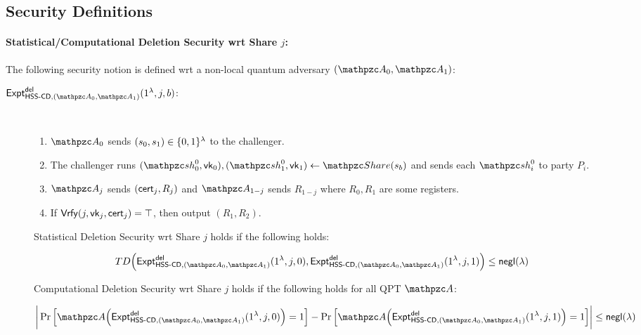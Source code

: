 \begin{description}
\begin{comment}
\item [Deletion Correctness (Optional):] The following condition
holds for all $i \in \bit$ and $q = \poly(\secp)$:
\begin{align}
\Pr\left[
\Vrfy(i, \vk_i, \cert_i) \rightarrow \top
\ :
\begin{array}{ll}
(\qsh_0^0, \vk_0), (\qsh_1^0, \vk_1) \gets \Sh(s)\\
\forall j \in [q]: (\sh_i^j, \qsh_i^j) \leftarrow \Ev(C_j, i,
(\sh_i^{j-1}, \qsh_i^{j-1}))\\
\cert_i \leftarrow \Del(i, \qsh_i^q)
\end{array}
\right] \geq 1 - \negl(\secp)
\end{align}
\end{comment}

\end{description}



\subsection{Security Definitions}
\paragraph{Statistical/Computational Deletion Security wrt Share $j$:}
The following security notion is defined wrt a non-local quantum
adversary $(\qA_0, \qA_1)$:

\begin{description}
\item [$\expa{\HSScd, (\qA_0, \qA_1)}{del}(1^\secp, j, b)$:] $ $
\begin{enumerate}
\item $\qA_0$ sends $(s_0, s_1) \in \{0,1\}^\lambda$ to the challenger.
\item 
The challenger runs
$(\qsh_0^0, \vk_0), (\qsh_1^0, \vk_1) \gets \Sh(s_b)$ and sends each
$\qsh_i^0$ to party $P_i$.

\item $\qA_j$ sends $(\mathsf{cert}_j, R_j)$ and $\qA_{1-j}$ sends $R_{1-j}$
where $R_0, R_1$ are some registers.
\item If $\mathsf{Vrfy}(j, \mathsf{vk}_j, \mathsf{cert}_j) = \top$, then output $(R_1, R_2)$.
\end{enumerate}

Statistical Deletion Security wrt Share $j$ holds if the following
holds:

$$TD\Big(\expa{\HSScd, (\qA_0, \qA_1)}{del}(1^\secp, j,
0), \expa{\HSScd, (\qA_0, \qA_1)}{del}(1^\secp, j,
1)\Big) \le \negl(\secp)$$

Computational Deletion Security wrt Share $j$ holds if the following
holds for all QPT $\qA$:

$$\bigg\lvert \Pr\Big[\qA\Big(\expa{\HSScd, (\qA_0,
\qA_1)}{del}(1^\secp, j, 0)\Big)=1\Big] -
\Pr\Big[\qA\Big(\expa{\HSScd, (\qA_0,
\qA_1)}{del}(1^\secp, j, 1)\Big)=1\Big]
\bigg\rvert \le \negl(\secp)$$

\end{description}


